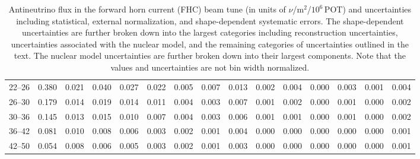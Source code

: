 \begin{turnpage}
\begin{table}[hpt]
\begin{tabular}{ccccc|cccc|cccccc}
  22--26 &  	 0.380 &  	 0.021 &  	 0.040 &  	 0.027 &  	 0.022 &  	 0.005 &  	 0.007 &  	 0.013 &  	 0.002 &  	 0.004 &  	 0.000 &  	 0.003 &  	 0.001 &  	 0.004 \\ 
  26--30 &  	 0.179 &  	 0.014 &  	 0.019 &  	 0.014 &  	 0.011 &  	 0.004 &  	 0.003 &  	 0.007 &  	 0.001 &  	 0.002 &  	 0.000 &  	 0.001 &  	 0.000 &  	 0.002 \\ 
  30--36 &  	 0.145 &  	 0.013 &  	 0.015 &  	 0.010 &  	 0.007 &  	 0.004 &  	 0.003 &  	 0.006 &  	 0.001 &  	 0.001 &  	 0.000 &  	 0.001 &  	 0.000 &  	 0.002 \\ 
  36--42 &  	 0.081 &  	 0.010 &  	 0.008 &  	 0.006 &  	 0.003 &  	 0.002 &  	 0.001 &  	 0.004 &  	 0.000 &  	 0.000 &  	 0.000 &  	 0.000 &  	 0.000 &  	 0.001 \\ 
  42--50 &  	 0.054 &  	 0.008 &  	 0.006 &  	 0.005 &  	 0.003 &  	 0.002 &  	 0.001 &  	 0.003 &  	 0.000 &  	 0.000 &  	 0.000 &  	 0.000 &  	 0.000 &  	 0.001 \\ 
  \hline
\end{tabular}
\caption{Antineutrino flux in the forward horn current (FHC) beam tune (in units of $\nu$/m$^2$/$10^6$\,POT) and uncertainties including statistical, external normalization, and shape-dependent systematic errors. The shape-dependent uncertainties are further broken down into the largest categories including reconstruction uncertainties, uncertainties associated with the nuclear model, and the remaining categories of uncertainties outlined in the text. The nuclear model uncertainties are further broken down into their largest components. Note that the values and uncertainties are not bin width normalized.}
\label{tbl:FHC-anti-flux}
\end{table}



\end{turnpage}
